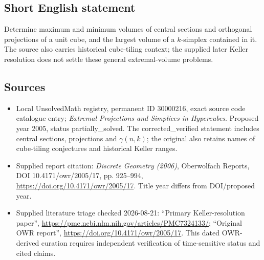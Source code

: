 \documentclass[11pt]{article}
\begin{document}
\subsection{Short English statement}
Determine maximum and minimum volumes of central sections and orthogonal projections of a unit cube, and the largest volume of a $k$-simplex contained in it. The source also carries historical cube-tiling context; the supplied later Keller resolution does not settle these general extremal-volume problems.
\subsection{Sources}
\begin{itemize}
\item Local UnsolvedMath registry, permanent ID 30000216, exact source code catalogue entry; \emph{Extremal Projections and Simplices in Hypercubes}. Proposed year 2005, status partially\_solved. The corrected\_verified statement includes central sections, projections and $\gamma(n,k)$; the original also retains names of cube-tiling conjectures and historical Keller ranges.
\item Supplied report citation: \emph{Discrete Geometry (2006)}, Oberwolfach Reports, DOI 10.4171/owr/2005/17, pp. 925--994, \url{https://doi.org/10.4171/owr/2005/17}. Title year differs from DOI/proposed year.
\item Supplied literature triage checked 2026-08-21: ``Primary Keller-resolution paper'', \url{https://pmc.ncbi.nlm.nih.gov/articles/PMC7324133/}; ``Original OWR report'', \url{https://doi.org/10.4171/owr/2005/17}. This dated OWR-derived curation requires independent verification of time-sensitive status and cited claims.
\end{itemize}
\end{document}

